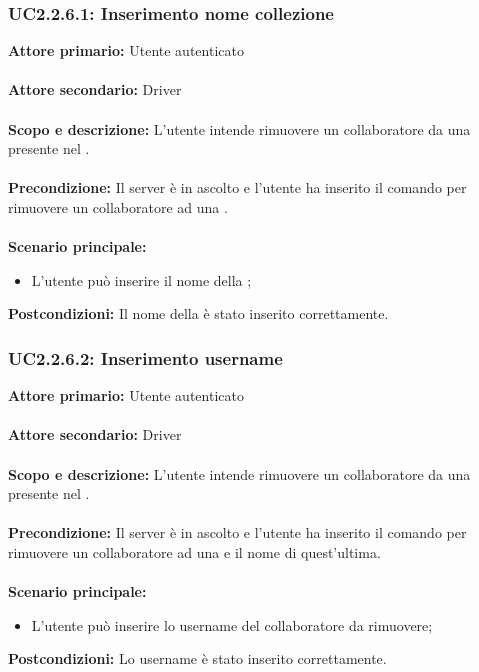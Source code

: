 \documentclass{scalatekids-article}
\begin{document}
\subsubsection{UC2.2.6.1: Inserimento nome collezione}

\textbf{Attore primario:} Utente autenticato\\ \\
\textbf{Attore secondario:} Driver\\ \\
\textbf{Scopo e descrizione:} L’utente intende rimuovere un collaboratore da una  presente nel .\\ \\
\textbf{Precondizione:} Il server è in ascolto e l’utente ha inserito il comando per rimuovere un collaboratore ad una .\\ \\
\textbf{Scenario principale:}
\begin{itemize}
\item L'utente può inserire il nome della ;
\end{itemize}
\textbf{Postcondizioni:} Il nome della  è stato inserito correttamente.

\subsubsection{UC2.2.6.2: Inserimento username}

\textbf{Attore primario:} Utente autenticato\\ \\
\textbf{Attore secondario:} Driver\\ \\
\textbf{Scopo e descrizione:} L’utente intende rimuovere un collaboratore da una  presente nel .\\ \\
\textbf{Precondizione:} Il server è in ascolto e l’utente ha inserito il comando per rimuovere un collaboratore ad una  e il nome di quest'ultima.\\ \\
\textbf{Scenario principale:}
\begin{itemize}
\item L'utente può inserire lo username del collaboratore da rimuovere;
\end{itemize}
\textbf{Postcondizioni:} Lo username è stato inserito correttamente.
\end{document}
